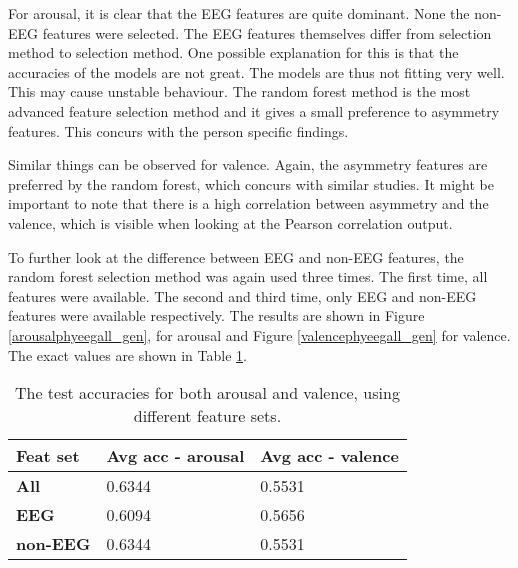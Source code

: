 For arousal, it is clear that the EEG features are quite dominant. None the non-EEG features were selected. The EEG features themselves differ from selection method to selection method. One possible explanation for this is that the accuracies of the models are not great. The models are thus not fitting very well. This may cause unstable behaviour. The random forest method is the most advanced feature selection method and it gives a small preference to asymmetry features. This concurs with the person specific findings.

\npar

Similar things can be observed for valence. Again, the asymmetry features are preferred by the random forest, which concurs with similar studies. It might be important to note that there is a high correlation between asymmetry and the valence, which is visible when looking at the Pearson correlation output.

\npar

To further look at the difference between EEG and non-EEG features, the random forest selection method was again used three times. The first time, all features were available. The second and third time, only EEG and non-EEG features were available respectively. The results are shown in Figure \ref{arousalphyeegall_gen}, for arousal and Figure \ref{valencephyeegall_gen} for valence. The exact values are shown in Table \ref{phyeegallgenTable}.




\begin{table}[H]
\centering
\begin{tabular}{l|ll}
\textbf{Feat set}  & \textbf{Avg acc - arousal}       & \textbf{Avg acc - valence}          \\ \hline
\textbf{All}       & 0.6344           & 0.5531           \\
\textbf{EEG}       & 0.6094           & 0.5656           \\
\textbf{non-EEG}   & 0.6344           & 0.5531          
\end{tabular}
\caption{The test accuracies for both arousal and valence, using different feature sets.\label{phyeegallgenTable}}
\end{table}

